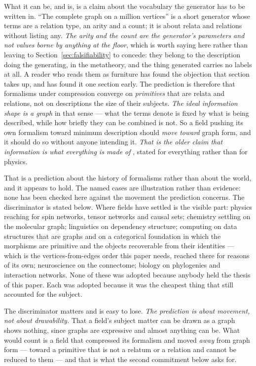 \documentclass[11pt,a4paper]{article}
\begin{document}
What it can be, and is, is a claim about the vocabulary the generator has to be written in. ``The
complete graph on a million vertices'' is a short generator whose terms are a relation type, an arity
and a count; it is about relata and relations without listing any. \emph{The arity and the count are
the generator's parameters and not values borne by anything at the floor}, which is worth saying here
rather than leaving to Section~\ref{sec:falsifiability} to concede: they belong to the description
doing the generating, in the metatheory, and the thing generated carries no labels at all. A reader who
reads them as furniture has found the objection that section takes up, and has found it one section
early. The prediction is therefore that
formalisms under compression converge on \emph{primitives} that are relata and relations, not on
descriptions the size of their subjects. \emph{The ideal information shape is a graph} in that sense
--- what the terms denote is fixed by what is being described, while how briefly they can be combined
is not. So a field pushing its own formalism toward minimum description should \emph{move toward}
graph form, and it should do so without anyone intending it. \emph{That is the older claim that
information is what everything is made of} \citep{wheeler1990,bateson1972}, stated for everything rather
than for physics.

That is a prediction about the history of formalisms rather than about the world, and it appears to
hold. The named cases are illustration rather than evidence: none has been checked here against the
movement the prediction concerns. The discriminator is stated below. Where fields have settled is the visible part: physics reaching for spin
networks, tensor networks and causal sets; chemistry settling on the
molecular graph; linguistics on dependency structure; computing on data structures that are graphs and on a categorical foundation in which the morphisms
are primitive and the objects recoverable from their identities --- which is the vertices-from-edges
order this paper needs, reached there for reasons of its own; neuroscience on the connectome; biology on
phylogenies and interaction networks. None of these was adopted because anybody held the thesis of this
paper. Each was adopted because it was the cheapest thing that still accounted for the subject.



The discriminator matters and is easy to lose. \emph{The prediction is about movement, not about
drawability.} That a field's subject matter can be drawn as a graph shows nothing, since graphs are
expressive and almost anything can be. What would count is a field that compressed its formalism and
moved \emph{away} from graph form --- toward a primitive that is not a relatum or a relation and cannot
be reduced to them --- and that is what the second commitment below asks for.
\end{document}
